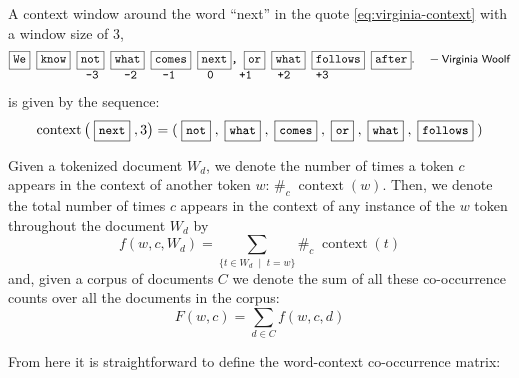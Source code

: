 \begin{example}
  A context window around the word ``next'' in the quote \eqref{eq:virginia-context} with a window size of 3,
  \begin{align}
    &\texttt{\fbox{We\vphantom{hy}} \fbox{know\vphantom{hy}} \fbox{not\vphantom{hy}} \fbox{what\vphantom{hy}} \fbox{comes\vphantom{hy}} \fbox{next\vphantom{hy}}, \fbox{or\vphantom{hy}} \fbox{what\vphantom{hy}} \fbox{follows\vphantom{hy}} \fbox{after\vphantom{hy}}}. \quad-\text{{\sffamily\small Virginia Woolf}}\nonumber\\[-.5em]
    &\texttt{~~~~~~~~~~~~-3~~~~-2~~~~-1~~~~~0~~~~+1~~~~+2~~~~+3}\label{eq:virginia-context}
  \end{align}
  is given by the sequence:\vspace{-0.5em}
  \begin{equation*}
    \operatorname{context}\big(\;\fbox{\small{\texttt{next}\vphantom{hy}}}\;, 3\big)= (\;\fbox{\small{\texttt{not}\vphantom{hy}}}\;, \;\fbox{\small{\texttt{what}\vphantom{hy}}}\;, \;\fbox{\small{\texttt{comes}\vphantom{hy}}}\;, \;\fbox{\small{\texttt{or}\vphantom{hy}}}\;, \;\fbox{\small{\texttt{what}\vphantom{hy}}}\;, \;\fbox{\small{\texttt{follows}\vphantom{hy}}}\;)
  \end{equation*}
  \vspace{0.5em}
\end{example}

\begin{definition}
  Given a tokenized document $W_d$, we denote the number of times a token $c$ appears in the context of another token $w$: $\#_c\;\operatorname{context}(w)$. Then, we denote the total number of times $c$ appears in the context of any instance of the $w$ token throughout the document $W_d$ by
  \begin{equation}
    f(w,c,W_d)=\sum_{\{t\in W_d\;\mid\; t=w\}}\#_c\;\operatorname{context}(t)
  \end{equation}
  and, given a corpus of documents $C$ we denote the sum of all these co-occurrence counts over all the documents in the corpus:
  \begin{equation}
    F(w,c)=\sum_{d\in C}f(w,c,d)
  \end{equation}
\end{definition}

From here it is straightforward to define the word-context co-occurrence matrix:

